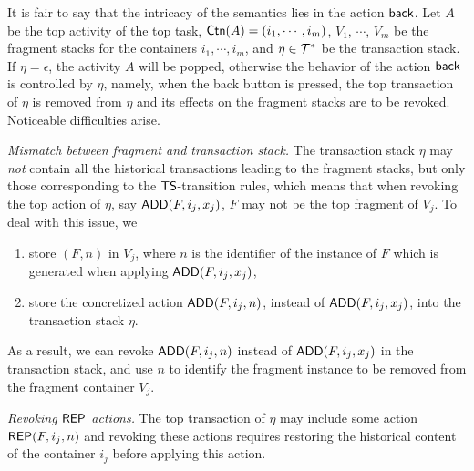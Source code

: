 It is fair to say that the intricacy of the semantics lies in the action ${\mathsf{back} }$. Let $A$ be the top activity of the top task, %
${\sf Ctn}(A)=(i_1, \cdots, i_m)$, $V_{1}$, $\cdots$, $V_{m}$ be the fragment stacks for the containers $i_1, \cdots, i_m$,  
and $\eta \in \mathcal{T}^*$ be the transaction stack. 
If $\eta = \epsilon$, the activity $A$ will be popped, otherwise the behavior of the action ${\mathsf{back} }$ is controlled by $\eta$, namely, when the back button is pressed, the top transaction of $\eta$ is removed from $\eta$ and its effects on the fragment stacks %
are to be revoked. Noticeable difficulties arise.  %

\smallskip
\noindent\emph{Mismatch between fragment and transaction stack.} 
The transaction stack $\eta$ may \emph{not} contain all the historical transactions leading to the fragment stacks, but only those corresponding to the ${\sf TS}$-transition rules, which means that when revoking the top action of $\eta$, say $\mathsf{ADD}(F, i_j, x_j)$, $F$ may not be the top fragment of $V_j$. To deal with this issue, we 
\begin{enumerate}
\item store $(F, n)$ in $V_{j}$, where $n$ is the identifier of the instance of $F$ which is generated when applying $\mathsf{ADD}(F, i_j, x_j)$,  
\item store the concretized action $\mathsf{ADD}(F, i_j, n)$, instead of $\mathsf{ADD}(F, i_j, x_j)$, into the transaction stack $\eta$.
\end{enumerate}
As a result, we can revoke $\mathsf{ADD}(F, i_j, n)$ instead of $\mathsf{ADD}(F, i_j, x_j)$ in the transaction stack, and use $n$ to identify the fragment instance to be removed from the fragment container $V_j$.
%

\smallskip
\noindent\emph{Revoking $\mathsf{REP}$ actions.} The top transaction of $\eta$ may include some action $\mathsf{REP}(F, i_j, n)$ and revoking these actions requires restoring the historical content of the container $i_j$ before applying this action.

